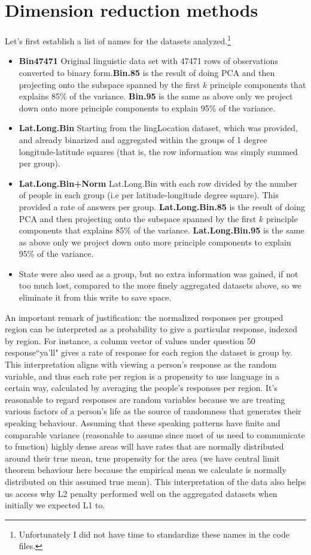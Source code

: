 \documentclass{article}\usepackage[]{graphicx}\usepackage[]{color}
\begin{document}
\section{Dimension reduction methods}

Let's first establish a list of names for the datasets analyzed.\footnote{ Unfortunately I did not have time to standardize these names in the code files.  }
\begin{itemize}
\item {\bf Bin47471} Original linguistic data set with 47471 rows of observations converted to binary form.{\bf Bin.85} is the result of doing PCA and then projecting onto the subspace spanned by the first $k$ principle components that explains 85\% of the variance.  {\bf Bin.95} is the same as above only we project down onto more principle components to explain 95\% of the variance.
\item {\bf Lat.Long.Bin} Starting from the lingLocation dataset, which was provided, and already binarized and aggregated within the groups of 1 degree longitude-latitude squares (that is, the row information was simply summed per group). 
\item {\bf Lat.Long.Bin+Norm} Lat.Long.Bin with each row divided by the number of people in each group (i.e per latitude-longitude degree square).  This provided a rate of answers per group. {\bf Lat.Long.Bin.85} is the result of doing PCA and then projecting onto the subspace spanned by the first $k$ principle components that explains 85\% of the variance.  {\bf Lat.Long.Bin.95} is the same as above only we project down onto more principle components to explain 95\% of the variance.   
\item State were also used as a group, but no extra information was gained, if not too much lost, compared to the more finely aggregated datasets above, so we eliminate it from this write to save space.  
\end{itemize}


An important remark of justification: the normalized responses per grouped region can be interpreted as a probability to give a particular response, indexed by region.  For instance, a column vector of values under question 50 response``ya'll" gives a rate of response for each region the dataset is group by.   This interpretation aligns with viewing a person's response as the random variable, and thus each rate per region is a propensity to use language in a certain way, calculated by averaging the people's responses per region.  It's reasonable to regard responses are random variables because we are treating various factors of a person's life as the source of randomness that generates their speaking behaviour.  Assuming that these speaking patterns have finite and comparable variance (reasonable to assume since most of us need to communicate to function) highly dense areas will have rates that are normally distributed around their true mean, true propensity for the area (we have central limit theorem behaviour here because the empirical mean we calculate is normally distributed on this assumed true mean).  This interpretation of the data also helps us access why L2 penalty performed well on the aggregated datasets when initially we expected L1 to.  \\
\end{document}
